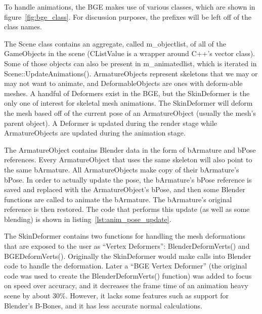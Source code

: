
To handle animations, the BGE makes use of various classes, which are shown in figure~\ref{fig:bge_class}. For discussion purposes, the prefixes will be left off of the class names.


The Scene class contains an aggregate, called m\_objectlist, of all of the GameObjects in the scene (CListValue is a wrapper around C++'s vector class). Some of those objects can also be present in m\_animatedlist, which is iterated in Scene::UpdateAnimations(). ArmatureObjects represent skeletons that we may or may not want to animate, and DeformableObjects are ones with deform-able meshes. A handful of Deformers exist in the BGE, but the SkinDeformer is the only one of interest for skeletal mesh animations. The SkinDeformer will deform the mesh based off of the current pose of an ArmatureObject (usually the mesh's parent object). A Deformer is updated during the render stage while ArmatureObjects are updated during the animation stage.

The ArmatureObject contains Blender data in the form of bArmature and bPose references. Every ArmatureObject that uses the same skeleton will also point to the same bArmature. All ArmatureObjects make copy of their bArmature's bPose. In order to actually update the pose, the bArmature's bPose reference is saved and replaced with the ArmatureObject's bPose, and then some Blender functions are called to animate the bArmature. The bArmature's original reference is then restored. The code that performs this update (as well as some blending) is shown in listing~\ref{lst:anim_pose_update}.


The SkinDeformer contains two functions for handling the mesh deformations that are exposed to the user as ``Vertex Deformers'': BlenderDeformVerts() and BGEDeformVerts(). Originally the SkinDeformer would make calls into Blender code to handle the deformation. Later a ``BGE Vertex Deformer'' (the original code was used to create the BlenderDeformVerts() function) was added to focus on speed over accuracy, and it decreases the frame time of an animation heavy scene by about 30\%. However, it lacks some features such as support for Blender's B-Bones, and it has less accurate normal calculations.


